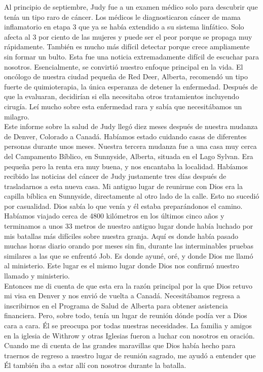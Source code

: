 \documentclass[twoside, 12pt]{book}
\begin{document}
Al principio de septiembre, Judy fue a un examen médico solo para descubrir que tenía un tipo raro de cáncer. Los médicos le diagnosticaron cáncer de mama inflamatorio en etapa 3 que ya se había extendido a su sistema linfático. Solo afecta al 3 por ciento de las mujeres y puede ser el peor porque se propaga muy rápidamente. También es mucho más difícil detectar porque crece ampliamente sin formar un bulto. Esta fue una noticia extremadamente difícil de escuchar para nosotros. Esencialmente, se convirtió nuestro enfoque principal en la vida.
El oncólogo de nuestra ciudad pequeña de Red Deer, Alberta, recomendó un tipo fuerte de quimioterapia, la única esperanza de detener la enfermedad. Después de que la evaluaran, decidirían si ella necesitaba otros tratamientos incluyendo cirugía. Leí mucho sobre esta enfermedad rara y sabía que necesitábamos un milagro.\\

Este informe sobre la salud de Judy llegó diez meses después de nuestra mudanza de Denver, Colorado a Canadá. Habíamos estado cuidando casas de diferentes personas durante unos meses. Nuestra tercera mudanza fue a una casa muy cerca del Campamento Bíblico, en Sunnyside, Alberta, situada en el Lago Sylvan. Era pequeña pero la renta era muy buena, y nos encantaba la localidad. Habíamos recibido las noticias del cáncer de Judy justamente tres días después de trasladarnos a esta nueva casa. Mi antiguo lugar de reunirme con Dios era la capilla bíblica en Sunnyside, directamente al otro lado de la calle. Esto no sucedió por casualidad. Dios sabía lo que venía y él estaba preparándonos el camino. Habíamos viajado cerca de 4800 kilómetros en los últimos cinco años y terminamos a unos 33 metros de nuestro antiguo lugar donde había luchado por mis batallas más difíciles sobre nuestra granja. Aquí es donde había pasado muchas horas diario orando por meses sin fin, durante las interminables pruebas similares a las que se enfrentó Job. Es donde ayuné, oré, y donde Dios me llamó al ministerio. Este lugar es el mismo lugar donde Dios nos confirmó nuestro llamado y ministerio.\\

Entonces me di cuenta de que esta era la razón principal por la que Dios retuvo mi visa en Denver y nos envió de vuelta a Canadá. Necesitábamos regresa a inscribirnos en el Programa de Salud de Alberta para obtener asistencia financiera. Pero, sobre todo, tenía un lugar de reunión dónde podía ver a Dios cara a cara. Él se preocupa por todas nuestras necesidades. La familia y amigos en la iglesia de Withrow y otras Iglesias fueron a luchar con nosotros en oración. Cuando me di cuenta de las grandes maravillas que Dios había hecho para traernos de regreso a nuestro lugar de reunión sagrado, me ayudó a entender que Él también iba a estar allí con nosotros durante la batalla.\\
\end{document}
